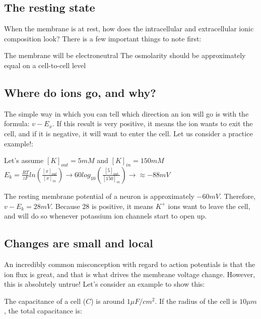 \documentclass[12pt]{amsart}
\begin{document}
\subsection{The resting state} When the membrane is at rest, how does the intracellular and extracellular ionic composition look? There is a few important things to note first:

\begin{outline}[enumerate]
\1 The membrane will be electroneutral
\1 The osmolarity should be approximately equal on a cell-to-cell level

\end{outline}

\subsection{Where do ions go, and why?} The simple way in which you can tell which direction an ion will go is with the formula: $v - E_x$. If this result is very positive, it means the ion wants to exit the cell, and if it is negative, it will want to enter the cell. Let us consider a practice example!: 

\bigskip
\begin{center}

    Let's assume $[K]_{out} = 5mM$ and $[K]_{in} = 150mM$\\
    \smallskip
    $E_k = \frac{RT}{zF}ln(\frac{[x]_{out}}{[x]_{in}}) \rightarrow 60log_{10}(\frac{[5]_{out}}{[150]_{in}}) \rightarrow \approx -88 mV$\\
    \smallskip
    
\end{center}

\bigskip

 The resting membrane potential of a neuron is approximately $-60mV$. Therefore, $v - E_k = 28mV$. Because 28 is positive, it means $K^+$ ions want to leave the cell, and will do so whenever potassium ion channels start to open up.  

\subsection{Changes are small and local} An incredibly common misconception with regard to action potentials is that the ion flux is great, and that is what drives the membrane voltage change. However, this is absolutely untrue! Let's consider an example to show this: 

\bigskip


    The capacitance of a cell ($C$) is around $1\mu F/cm^2$. If the radius of the cell is $10\mu m$, the total capacitance is:
\end{document}
